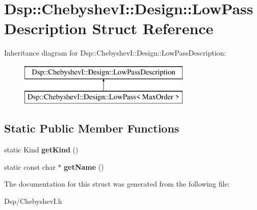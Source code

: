 \hypertarget{structDsp_1_1ChebyshevI_1_1Design_1_1LowPassDescription}{\section{Dsp\-:\-:Chebyshev\-I\-:\-:Design\-:\-:Low\-Pass\-Description Struct Reference}
\label{structDsp_1_1ChebyshevI_1_1Design_1_1LowPassDescription}
}
Inheritance diagram for Dsp\-:\-:Chebyshev\-I\-:\-:Design\-:\-:Low\-Pass\-Description\-:\begin{figure}[H]
\begin{center}
\leavevmode
\includegraphics[height=2.000000cm]{structDsp_1_1ChebyshevI_1_1Design_1_1LowPassDescription}
\end{center}
\end{figure}
\subsection*{Static Public Member Functions}
\begin{DoxyCompactItemize}
\item 
\hypertarget{structDsp_1_1ChebyshevI_1_1Design_1_1LowPassDescription_a374ca5d0008058da6b73f832afb3244b}{static Kind {\bfseries get\-Kind} ()}\label{structDsp_1_1ChebyshevI_1_1Design_1_1LowPassDescription_a374ca5d0008058da6b73f832afb3244b}

\item 
\hypertarget{structDsp_1_1ChebyshevI_1_1Design_1_1LowPassDescription_abada134b19d5ca1f4b172db6526f8a2e}{static const char $\ast$ {\bfseries get\-Name} ()}\label{structDsp_1_1ChebyshevI_1_1Design_1_1LowPassDescription_abada134b19d5ca1f4b172db6526f8a2e}

\end{DoxyCompactItemize}


The documentation for this struct was generated from the following file\-:\begin{DoxyCompactItemize}
\item 
Dsp/Chebyshev\-I.\-h\end{DoxyCompactItemize}
